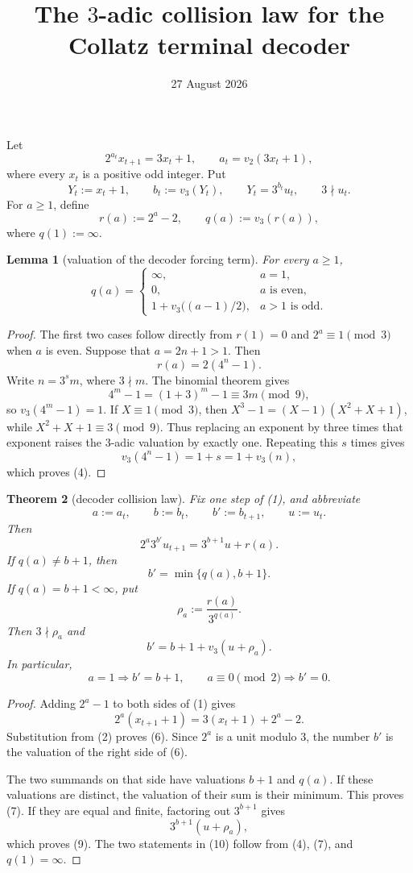\documentclass[11pt]{article}
\title{The $3$-adic collision law for the Collatz terminal decoder}
\author{}
\date{27 August 2026}
\newtheorem{theorem}{Theorem}
\newtheorem{lemma}[theorem]{Lemma}
\begin{document}
\maketitle

Let
\[
  2^{a_t}x_{t+1}=3x_t+1,
  \qquad
  a_t=v_2(3x_t+1),
  \tag{1}
\]
where every $x_t$ is a positive odd integer.  Put
\[
  Y_t:=x_t+1,
  \qquad
  b_t:=v_3(Y_t),
  \qquad
  Y_t=3^{b_t}u_t,
  \qquad
  3\nmid u_t.
  \tag{2}
\]
For $a\geq1$, define
\[
  r(a):=2^a-2,
  \qquad
  q(a):=v_3(r(a)),
  \tag{3}
\]
where $q(1):=\infty$.

\begin{lemma}[valuation of the decoder forcing term]
For every $a\geq1$,
\[
  q(a)=
  \begin{cases}
    \infty,&a=1,\\
    0,&a\text{ is even},\\
    1+v_3\bigl((a-1)/2\bigr),&a>1\text{ is odd}.
  \end{cases}
  \tag{4}
\]
\end{lemma}

\begin{proof}
The first two cases follow directly from $r(1)=0$ and
$2^a\equiv1\pmod3$ when $a$ is even.  Suppose that $a=2n+1>1$.  Then
\[
  r(a)=2(4^n-1).
  \tag{5}
\]
Write $n=3^s m$, where $3\nmid m$.  The binomial theorem gives
\[
  4^m-1=(1+3)^m-1\equiv3m\pmod9,
\]
so $v_3(4^m-1)=1$.  If $X\equiv1\pmod3$, then
$X^3-1=(X-1)(X^2+X+1)$, while $X^2+X+1\equiv3\pmod9$.  Thus replacing an
exponent by three times that exponent raises the
$3$-adic valuation by exactly one.  Repeating this $s$ times gives
\[
  v_3(4^n-1)=1+s=1+v_3(n),
\]
which proves (4).
\end{proof}

\begin{theorem}[decoder collision law]
Fix one step of (1), and abbreviate
\[
  a:=a_t,
  \qquad
  b:=b_t,
  \qquad
  b':=b_{t+1},
  \qquad
  u:=u_t.
\]
Then
\[
\boxed{
  2^a3^{b'}u_{t+1}=3^{b+1}u+r(a).}
\tag{6}
\]
If $q(a)\neq b+1$, then
\[
\boxed{b'=\min\{q(a),b+1\}.}
\tag{7}
\]
If $q(a)=b+1<\infty$, put
\[
  \rho_a:=\frac{r(a)}{3^{q(a)}}.
  \tag{8}
\]
Then $3\nmid\rho_a$ and
\[
\boxed{
  b'=b+1+v_3(u+\rho_a).}
\tag{9}
\]
In particular,
\[
  a=1\Longrightarrow b'=b+1,
  \qquad
  a\equiv0\pmod2\Longrightarrow b'=0.
  \tag{10}
\]
\end{theorem}

\begin{proof}
Adding $2^a-1$ to both sides of (1) gives
\[
  2^a(x_{t+1}+1)=3(x_t+1)+2^a-2.
\]
Substitution from (2) proves (6).  Since $2^a$ is a unit modulo $3$, the
number $b'$ is the valuation of the right side of (6).

The two summands on that side have valuations $b+1$ and $q(a)$.  If these
valuations are distinct, the valuation of their sum is their minimum.  This
proves (7).  If they are equal and finite, factoring out $3^{b+1}$ gives
\[
  3^{b+1}(u+\rho_a),
\]
which proves (9).  The two statements in (10) follow from (4), (7), and
$q(1)=\infty$.
\end{proof}
\end{document}
